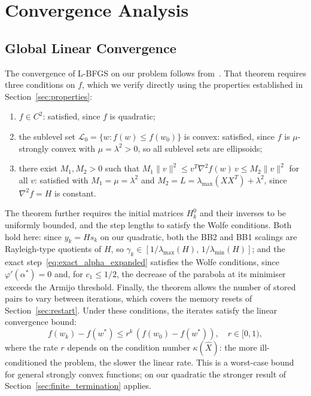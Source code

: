 \section{Convergence Analysis}
\label{sec:convergence}

\subsection{Global Linear Convergence}

\noindent The convergence of L-BFGS on our problem follows
from~\cite[Theorem~7.1]{liu1989limited}. That theorem requires three conditions on $f$,
which we verify directly using the properties established in
Section~\ref{sec:properties}:
\begin{enumerate}[nosep]
    \item $f \in C^2$: satisfied, since $f$ is quadratic;
    \item the sublevel set $\mathcal{L}_0 = \{w : f(w) \leq f(w_0)\}$ is
          convex: satisfied, since $f$ is $\mu$-strongly convex with
          $\mu = \lambda^2 > 0$, so all sublevel sets are ellipsoids;
    \item there exist $M_1, M_2 > 0$ such that
          $M_1\|v\|^2 \leq v^T \nabla^2 f(w)\,v \leq M_2\|v\|^2$ for all $v$:
          satisfied with $M_1 = \mu = \lambda^2$ and
          $M_2 = L = \lambda_{\max}(XX^T) + \lambda^2$, since
          $\nabla^2 f = H$ is constant.
\end{enumerate}
\noindent The theorem further requires the initial matrices $H_k^0$ and their
inverses to be uniformly bounded, and the step lengths to satisfy the Wolfe
conditions. Both hold here: since $y_k = H s_k$ on our quadratic, both the BB2
and BB1 scalings are Rayleigh-type quotients of $H$, so
$\gamma_k \in [1/\lambda_{\max}(H),\, 1/\lambda_{\min}(H)]$; and the exact
step~\eqref{eq:exact_alpha_expanded} satisfies the Wolfe conditions, since
$\varphi'(\alpha^*) = 0$ and, for $c_1 \le 1/2$, the decrease of the parabola
at its minimiser exceeds the Armijo threshold. Finally, the theorem allows the
number of stored pairs to vary between iterations, which covers the memory
resets of Section~\ref{sec:restart}.
Under these conditions, the iterates satisfy the linear convergence bound:
\begin{equation}
\label{eq:linconv}
    f(w_k) - f(w^*) \leq r^k\,(f(w_0) - f(w^*)), \quad r \in [0,1),
\end{equation}
where the rate $r$ depends on the condition number $\kappa(\hat{X})$: the more
ill-conditioned the problem, the slower the linear rate. This is a worst-case
bound for general strongly convex functions; on our quadratic the stronger
result of Section~\ref{sec:finite_termination} applies.

